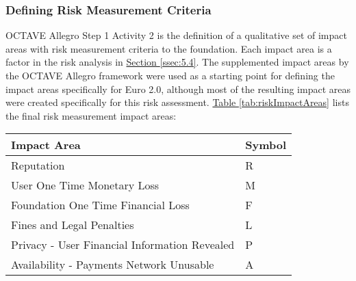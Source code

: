 \documentclass[12pt]{article} %
\newcommand{\hypertableref}[1]{\hyperref[#1]{Table \ref{#1}}}
\newcommand{\hypersectionref}[1]{\hyperref[#1]{Section \ref{#1}}}
\begin{document}
{\begin{center}
\end{center}
\label{tab:organizationStructure}

\subsubsection{Defining Risk Measurement Criteria} \label{sssec:5.1:defining}

OCTAVE Allegro Step 1 Activity 2 is the definition of a qualitative set of impact areas with risk measurement criteria to the foundation. Each impact area is a factor in the risk analysis in \hypersectionref{ssec:5.4}. The supplemented impact areas by the OCTAVE Allegro framework were used as a starting point for defining the impact areas specifically for Euro 2.0, although most of the resulting impact areas were created specifically for this risk assessment. \hypertableref{tab:riskImpactAreas} lists the final risk measurement impact areas:

\begin{center}
\begin{tabular}{ | l | l |}
  \hline
  \textbf{Impact Area} & \textbf{Symbol}
  \\ \hline
  Reputation & R
  \\ \hline
  User One Time Monetary Loss & M
  \\ \hline
  Foundation One Time Financial Loss & F
  \\ \hline
  Fines and Legal Penalties & L
  \\ \hline
  Privacy - User Financial Information Revealed & P
  \\ \hline
  Availability - Payments Network Unusable & A
  \\ \hline
\end{tabular}
\end{center}
\label{tab:riskImpactAreas}

}
\end{document}
